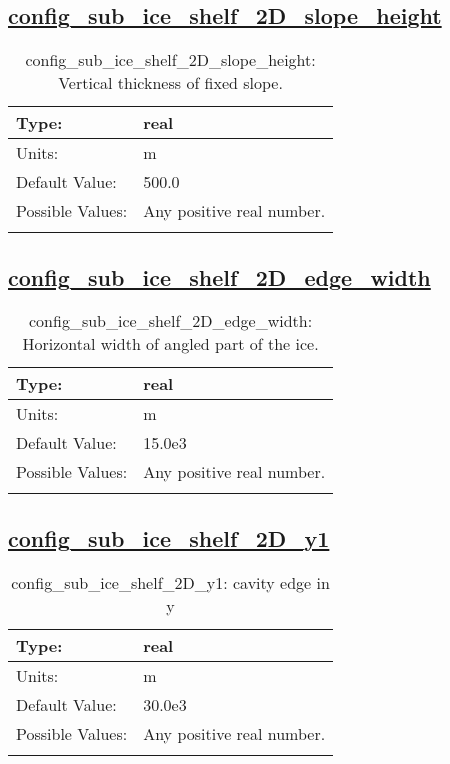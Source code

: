 \subsection[config\_sub\_ice\_shelf\_2D\_slope\_height]{\hyperref[sec:nm_tab_sub_ice_shelf_2D]{config\_sub\_ice\_shelf\_2D\_slope\_height}}
\label{subsec:nm_sec_config_sub_ice_shelf_2D_slope_height}
\begin{center}
\begin{longtable}{| p{2.0in} || p{4.0in} |}
    \hline
    Type: & real \\
    \hline
    Units: & \si{m} \\
    \hline
    Default Value: & 500.0 \\
    \hline
    Possible Values: & Any positive real number. \\
    \hline
    \caption{config\_sub\_ice\_shelf\_2D\_slope\_height: Vertical thickness of fixed slope.}
\end{longtable}
\end{center}
\subsection[config\_sub\_ice\_shelf\_2D\_edge\_width]{\hyperref[sec:nm_tab_sub_ice_shelf_2D]{config\_sub\_ice\_shelf\_2D\_edge\_width}}
\label{subsec:nm_sec_config_sub_ice_shelf_2D_edge_width}
\begin{center}
\begin{longtable}{| p{2.0in} || p{4.0in} |}
    \hline
    Type: & real \\
    \hline
    Units: & \si{m} \\
    \hline
    Default Value: & 15.0e3 \\
    \hline
    Possible Values: & Any positive real number. \\
    \hline
    \caption{config\_sub\_ice\_shelf\_2D\_edge\_width: Horizontal width of angled part of the ice.}
\end{longtable}
\end{center}
\subsection[config\_sub\_ice\_shelf\_2D\_y1]{\hyperref[sec:nm_tab_sub_ice_shelf_2D]{config\_sub\_ice\_shelf\_2D\_y1}}
\label{subsec:nm_sec_config_sub_ice_shelf_2D_y1}
\begin{center}
\begin{longtable}{| p{2.0in} || p{4.0in} |}
    \hline
    Type: & real \\
    \hline
    Units: & \si{m} \\
    \hline
    Default Value: & 30.0e3 \\
    \hline
    Possible Values: & Any positive real number. \\
    \hline
    \caption{config\_sub\_ice\_shelf\_2D\_y1: cavity edge in y}
\end{longtable}
\end{center}
